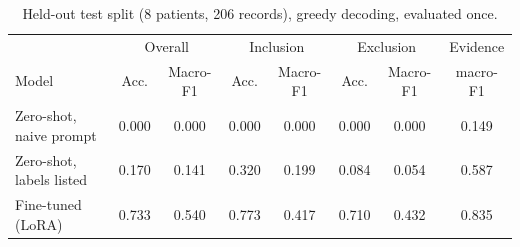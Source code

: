 \begin{table}[t]\centering\small
\caption{Held-out test split (8 patients, 206 records), greedy decoding, evaluated once.}\label{tab:test}
\begin{tabular}{lccccccc}\toprule
 & \multicolumn{2}{c}{Overall} & \multicolumn{2}{c}{Inclusion} & \multicolumn{2}{c}{Exclusion} & Evidence\\
Model & Acc. & Macro-F1 & Acc. & Macro-F1 & Acc. & Macro-F1 & macro-F1\\\midrule
Zero-shot, naive prompt & 0.000 & 0.000 & 0.000 & 0.000 & 0.000 & 0.000 & 0.149 \\
Zero-shot, labels listed & 0.170 & 0.141 & 0.320 & 0.199 & 0.084 & 0.054 & 0.587 \\
Fine-tuned (LoRA) & 0.733 & 0.540 & 0.773 & 0.417 & 0.710 & 0.432 & 0.835 \\
\bottomrule\end{tabular}\end{table}
